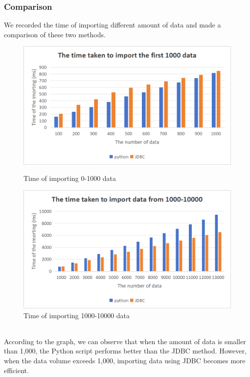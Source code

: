 \documentclass{article}
\begin{document}
\subsubsection{Comparison}
We recorded the time of importing different amount of data and made a comparison of these two methods.
\begin{figure}[h]
    \centering
    \begin{minipage}{0.45\textwidth}
        \centering
        \includegraphics[width=\textwidth]{前1000数据.png}
        \caption{Time of importing 0-1000 data}
        \label{fig:er_diagram_1}
    \end{minipage}
    \hspace{0.05\textwidth} %
    \begin{minipage}{0.45\textwidth}
        \centering
        \includegraphics[width=\textwidth]{python1000-10000.png}
        \caption{Time of importing 1000-10000 data}
        \label{fig:er_diagram_2}
    \end{minipage}
\end{figure}
\\According to the graph, we can observe that when the amount of data is smaller than 1,000, the Python script performs better than the JDBC method. However, when the data volume exceeds 1,000, importing data using JDBC becomes more efficient.
\end{document}
